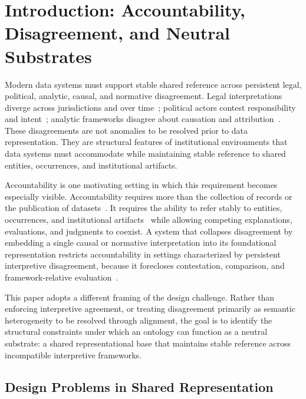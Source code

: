 
\section{Introduction: Accountability, Disagreement, and Neutral Substrates}
\label{sec:introduction}

Modern data systems must support stable shared reference
across persistent legal, political, analytic, causal, and normative disagreement.
Legal interpretations diverge across jurisdictions and
over time~\citep{dworkin1986law,hart1961concept,berman2007pluralism};
political actors contest responsibility
and intent~\citep{bovens2007accountability,hood2011blame};
analytic frameworks disagree about
causation and attribution~\citep{woodward2003making}.
These disagreements are not anomalies to be resolved prior to data representation.
They are structural features of institutional environments
that data systems must accommodate
while maintaining stable reference to shared
entities, occurrences, and institutional artifacts.

Accountability is one motivating setting in which this requirement
becomes especially visible.
Accountability requires more than the collection of records or
the publication of datasets~\citep{fox2007transparency,bovens2014oxford}.
It requires the ability to refer stably to entities,
occurrences, and institutional artifacts~\citep{gruber1993translation,smith2010ontology}
while allowing competing explanations, evaluations, and judgments to coexist.
A system that collapses disagreement by embedding a single
causal or normative interpretation into its foundational
representation restricts accountability in settings characterized
by persistent interpretive disagreement,
because it forecloses contestation, comparison, and
framework-relative evaluation~\citep{bowker1999sorting,winner1980artifacts}.

This paper adopts a different framing of the design challenge.
Rather than enforcing interpretive agreement,
or treating disagreement primarily as semantic heterogeneity
to be resolved through alignment,
the goal is to identify the structural constraints
under which an ontology can function as a neutral substrate:
a shared representational base that maintains stable reference
across incompatible interpretive frameworks.

\subsection*{Design Problems in Shared Representation}

